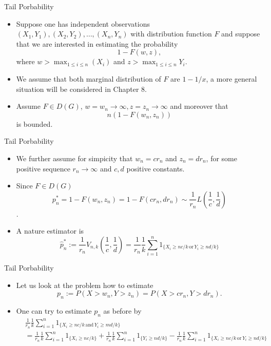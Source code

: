 \documentclass[11pt]{beamer}
\begin{document}
\begin{frame}{Tail Porbability}
\begin{itemize}
\item Suppose one has independent observations $(X_1,Y_1),(X_2,Y_2),\dots,(X_n,Y_n)$ with distribution function $F$ and suppose that we are interested in estimating the probability
\begin{displaymath}
1-F(w,z),
\end{displaymath}
where $w>\max_{1\le i\le n}(X_i)$ and $z>\max_{1\le i\le n}Y_i$.
\item We assume that both marginal distribution of $F$ are $1-1/x$, a more general situation will be considered in Chapter 8.
\item Assume $F\in D(G)$, $w=w_n \to \infty, z=z_n \to \infty$ and moreover that
\begin{displaymath}
n(1-F(w_n,z_n))
\end{displaymath}
is bounded.
\end{itemize}
\end{frame}
\begin{frame}{Tail Porbability}
\begin{itemize}
\item We further assume for simpicity that $w_n=cr_n$ and $z_n=dr_n$, for some positive sequence $r_n\to \infty$ and $c,d$ positive constants.
\item  Since $F\in D(G)$
$$p_n^{*}=1-F(w_n,z_n)=1-F(cr_n,dr_n)\sim \frac{1}{r_n} L(\frac{1}{c},\frac{1}{d})$$.
\item  A nature estimator is 
   $$\hat{p}_n^{*}:=\frac{1}{r_n} V_{n,k}(\frac{1}{c},\frac{1}{d})=\frac{1}{r_n}\frac{1}{k}\sum_{i=1}^n 1_{\{  X_i\ge nc/k\,\text{or} \, Y_i\ge nd/k  \}}$$
\end{itemize}
\end{frame}
\begin{frame}{Tail Porbability}
\begin{itemize}
\item Let us look at the problem how to estimate 
\begin{displaymath}
p_n:=P(X>w_n, Y>z_n)=P(X>cr_n,Y>dr_n).
\end{displaymath}
\item One can try to estimate $p_n$ as before by
\begin{displaymath}
\begin{split}
&\frac{1}{r_n}\frac{1}{k} \sum_{i=1}^n 1_{\{X_i \ge nc/k \, \text{and} \, Y_i\ge md/k\}} \\
&=\frac{1}{r_n}\frac{1}{k} \sum_{i=1}^n1_{\{X_i\ge nc/k\}}+\frac{1}{r_n}\frac{1}{k} \sum_{i=1}^n1_{\{Y_i\ge nd/k\}}-
\frac{1}{r_n}\frac{1}{k} \sum_{i=1}^n1_{\{X_i\ge nc/k \, \text{or}\, Y_i\ge nd/k\}}
\end{split}
\end{displaymath}
\end{itemize}
\end{frame}
\end{document}
